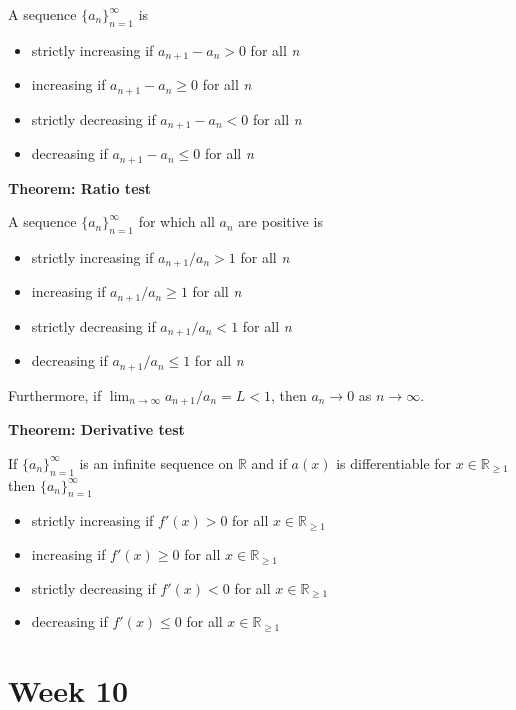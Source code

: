 \documentclass{article}
\newcommand*{\R}{\mathbb{R}}
\begin{document}
A sequence \(\{a_n\}^{\infty}_{n=1}\) is
\begin{itemize}
    \item strictly increasing if \(a_{n+1} - a_n > 0\) for all \textit{n}
    \item increasing if \(a_{n+1} - a_n \geq 0\) for all \textit{n}
    \item strictly decreasing if \(a_{n+1} - a_n < 0\) for all \textit{n}
    \item decreasing if \(a_{n+1} - a_n \leq 0\) for all \textit{n}
\end{itemize}

\vspace{\baselineskip}
\textbf{Theorem: Ratio test}

A sequence \(\{a_n\}^{\infty}_{n=1}\) for which all \(a_n\) are positive is
\begin{itemize}
    \item strictly increasing if \(a_{n+1} / a_n > 1\) for all \textit{n}
    \item increasing if \(a_{n+1} / a_n \geq 1\) for all \textit{n}
    \item strictly decreasing if \(a_{n+1} / a_n < 1\) for all \textit{n}
    \item decreasing if \(a_{n+1} / a_n \leq 1\) for all \textit{n}
\end{itemize}
Furthermore, if \(\lim_{n\to\infty}a_{n+1}/a_n = L < 1\), then \(a_n \to 0\) as \(n \to \infty\).

\vspace{\baselineskip}
\textbf{Theorem: Derivative test}

If  \(\{a_n\}^{\infty}_{n=1}\) is an infinite sequence on \(\R\) and if \(a(x)\) is differentiable for \(x \in \R_{\geq 1}\) then \(\{a_n\}^{\infty}_{n=1}\)
\begin{itemize}
    \item strictly increasing if \(f'(x) > 0\) for all \(x\in\R_{\geq 1}\)
    \item increasing if \(f'(x) \geq 0\) for all \(x\in\R_{\geq 1}\)
    \item strictly decreasing if \(f'(x) < 0\) for all \(x\in\R_{\geq 1}\)
    \item decreasing if \(f'(x) \leq 0\) for all \(x\in\R_{\geq 1}\)
\end{itemize}

\section{Week 10}
\end{document}
